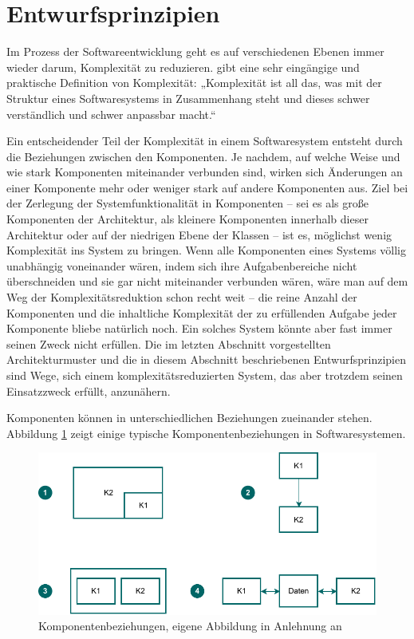 \section{Entwurfsprinzipien}
\label{sec:Kap-7.2}

Im Prozess der Softwareentwicklung geht es auf verschiedenen Ebenen immer wieder darum, Komplexität zu reduzieren. \cite[19]{ous21} gibt eine sehr eingängige und praktische Definition von Komplexität: „Komplexität ist all das, was mit der Struktur eines Soft\-ware\-sys\-tems in Zusammenhang steht und dieses schwer verständlich und schwer anpassbar macht.“

Ein entscheidender Teil der Komplexität in einem Softwaresystem entsteht durch die Beziehungen zwischen den Komponenten. Je nachdem, auf welche Weise und wie stark Komponenten miteinander verbunden sind, wirken sich Änderungen an einer Komponente mehr oder weniger stark auf andere Komponenten aus. Ziel bei der Zerlegung der Systemfunktionalität in Komponenten – sei es als große Komponenten der Architektur, als kleinere Komponenten innerhalb dieser Architektur oder auf der niedrigen Ebene der Klassen – ist es, möglichst wenig Komplexität ins System zu bringen. Wenn alle Komponenten eines Systems völlig unabhängig voneinander wären, indem sich ihre Aufgabenbereiche nicht überschneiden und sie gar nicht miteinander verbunden wären, wäre man auf dem Weg der Komplexitäts\-reduktion schon recht weit – die reine Anzahl der Komponenten und die inhaltliche Komplexität der zu erfüllenden Aufgabe jeder Komponente bliebe natürlich noch. Ein solches System könnte aber fast immer seinen Zweck nicht erfüllen. Die im letzten Abschnitt vorgestellten Architekturmuster und die in diesem Abschnitt beschriebenen Entwurfsprinzipien sind Wege, sich einem komplexitätsreduzierten System, das aber trotzdem seinen Einsatzzweck erfüllt, anzunähern.


Komponenten können in unterschiedlichen Beziehungen zueinander stehen. Abbildung \ref{fig:komponentenbeziehungen} zeigt einige typische Komponentenbeziehungen in Softwaresystemen.

\vspace{\baselineskip} %

\begin{figure}[h!]
	\centering
	\includegraphics{Bilder/Kapitel-7/komponentenbeziehungen.pdf}
	\caption[Komponentenbeziehungen]{Komponentenbeziehungen, eigene Abbildung in Anlehnung an \cite[105]{som20}}
	\label{fig:komponentenbeziehungen}
\end{figure}

